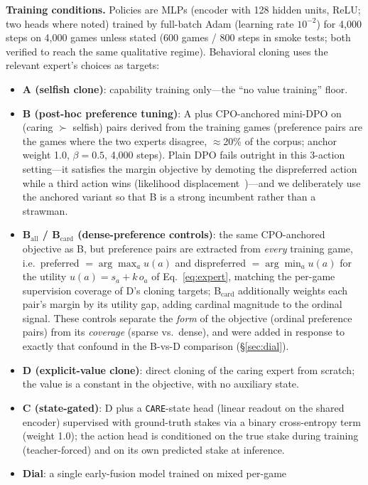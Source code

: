 \documentclass[manuscript, screen, review]{jair}
\newcommand{\care}{\texttt{CARE}}
\begin{document}
\textbf{Training conditions.} Policies are MLPs (encoder with 128 hidden units, ReLU; two heads
where noted) trained by full-batch Adam (learning rate $10^{-2}$) for 4{,}000 steps on 4{,}000
games unless stated (600 games / 800 steps in smoke tests; both verified to reach the same
qualitative regime). Behavioral cloning uses the relevant expert's choices as targets:
\begin{itemize}
\item \textbf{A (selfish clone)}: capability training only---the ``no value training'' floor.
\item \textbf{B (post-hoc preference tuning)}: A plus CPO-anchored mini-DPO on
  (caring $\succ$ selfish) pairs derived from the training games (preference pairs are the games
  where the two experts disagree, $\approx$20\% of the corpus; anchor weight 1.0,
  $\beta{=}0.5$, 4{,}000 steps). Plain DPO fails outright in this 3-action setting---it
  satisfies the margin objective by demoting the dispreferred action while a third action wins
  (likelihood displacement~\citep{razin2024unintentional})---and we deliberately use the anchored
  variant so that B is a strong incumbent rather than a strawman.
\item \textbf{B$_{\mathrm{all}}$ / B$_{\mathrm{card}}$ (dense-preference controls)}: the same
  CPO-anchored objective as B, but preference pairs are extracted from \emph{every} training
  game, i.e.\ preferred $= \arg\max_a u(a)$ and dispreferred $= \arg\min_a u(a)$ for the
  utility $u(a) = s_a + k\,o_a$ of Eq.~\eqref{eq:expert}, matching the per-game supervision coverage of D's cloning targets;
  B$_{\mathrm{card}}$ additionally weights each pair's margin by its utility gap, adding cardinal
  magnitude to the ordinal signal. These controls separate the \emph{form} of the objective
  (ordinal preference pairs) from its \emph{coverage} (sparse vs.\ dense), and were added in
  response to exactly that confound in the B-vs-D comparison (\S\ref{sec:dial}).
\item \textbf{D (explicit-value clone)}: direct cloning of the caring expert from scratch; the
  value is a constant in the objective, with no auxiliary state.
\item \textbf{C (state-gated)}: D plus a \care{}-state head (linear readout on the shared
  encoder) supervised with ground-truth stakes via a binary cross-entropy term (weight 1.0);
  the action head is conditioned on the true stake during training (teacher-forced) and on its
  own predicted stake at inference.
\item \textbf{Dial}: a single early-fusion model trained on mixed per-game

\end{itemize}
\end{document}

